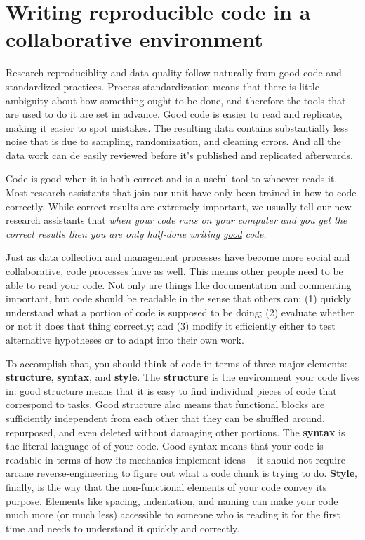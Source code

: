 \section{Writing reproducible code in a collaborative environment}

Research reproduciblity and data quality follow naturally from
good code and standardized practices.
Process standardization means that there is
little ambiguity about how something ought to be done,
and therefore the tools that are used to do it are set in advance.
Good code is easier to read and replicate, making it easier to spot mistakes.
The resulting data contains substantially less noise
that is due to sampling, randomization, and cleaning errors. And all the data work can de easily reviewed before it's published and replicated afterwards.

Code is good when it is both correct and is a useful tool to whoever reads it. 
Most research assistants that join our unit have only been trained in how to code correctly. 
While correct results are extremely important, we usually tell our new research assistants that 
\textit{when your code runs on your computer and you get the correct results then you are only half-done writing \underline{good} code.}


Just as data collection and management processes have become more social and collaborative,
code processes have as well. This means other people need to be able to read your code.
Not only are things like documentation and commenting important,
but code should be readable in the sense that others can:
(1) quickly understand what a portion of code is supposed to be doing;
(2) evaluate whether or not it does that thing correctly; and
(3) modify it efficiently either to test alternative hypotheses
or to adapt into their own work.

To accomplish that, you should think of code in terms of three major elements:
\textbf{structure}, \textbf{syntax}, and \textbf{style}.
The \textbf{structure} is the environment your code lives in:
good structure means that it is easy to find individual pieces of code that correspond to tasks.
Good structure also means that functional blocks are sufficiently independent from each other
that they can be shuffled around, repurposed, and even deleted without damaging other portions.
The \textbf{syntax} is the literal language of of your code.
Good syntax means that your code is readable
in terms of how its mechanics implement ideas --
it should not require arcane reverse-engineering
to figure out what a code chunk is trying to do.
\textbf{Style}, finally, is the way that the non-functional elements of your code convey its purpose.
Elements like spacing, indentation, and naming can make your code much more (or much less)
accessible to someone who is reading it for the first time and needs to understand it quickly and correctly.

